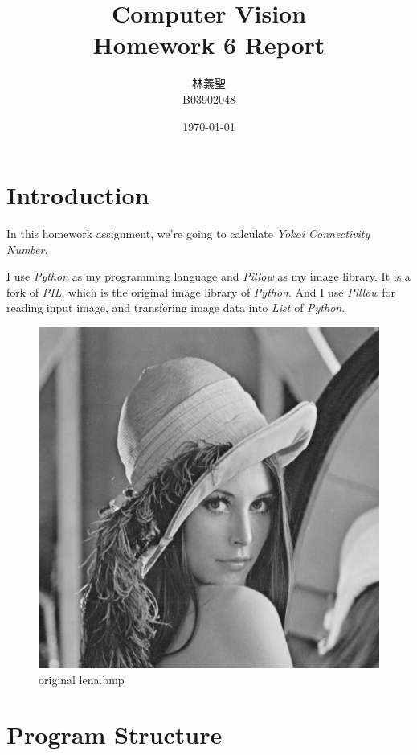 \documentclass[14pt,a4paper]{extarticle}
\title{Computer Vision\\Homework 6 Report}
\author{林義聖\\B03902048}
\date{\today}
\begin{document}
\maketitle
\thispagestyle{fancy}

\section*{Introduction}

In this homework assignment, we're going to calculate \textit{Yokoi Connectivity Number}.

I use \textit{Python} as my programming language and \textit{Pillow} as my image library. It is a fork of \textit{PIL}, which is the original image library of \textit{Python}. And I use \textit{Pillow} for reading input image, and transfering image data into \textit{List} of \textit{Python}.

\begin{figure}[H]
\centering
\includegraphics[scale=0.5]{lena.bmp}
\caption{original lena.bmp}
\label{fig:lena.bmp}
\end{figure}

\section*{Program Structure}
\end{document}
